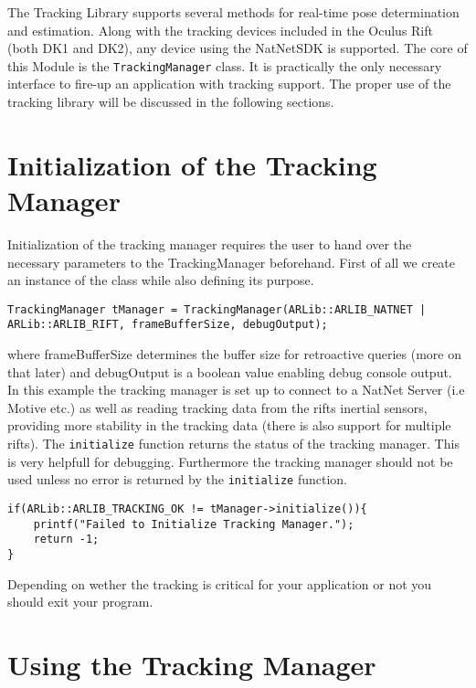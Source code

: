 The Tracking Library supports several methods for real-time pose determination and estimation. Along with the tracking devices included in the Oculus Rift (both DK1 and DK2\cite{dk2}), any device using the NatNetSDK\cite{optitrack} is supported. The core of this Module is the \texttt{TrackingManager} class. It is practically the only necessary interface to fire-up an application with tracking support. The proper use of the tracking library will be discussed in the following sections.
\section{Initialization of the Tracking Manager}\label{tracking-manager-initialization}

Initialization of the tracking manager requires the user to hand over the necessary parameters to the TrackingManager beforehand. First of all we create an instance of the class while also defining its purpose.

\begin{lstlisting}
TrackingManager tManager = TrackingManager(ARLib::ARLIB_NATNET | ARLib::ARLIB_RIFT, frameBufferSize, debugOutput);
\end{lstlisting}
where frameBufferSize determines the buffer size for retroactive queries (more on that later) and debugOutput is a boolean value enabling debug console output. In this example the tracking manager is set up to connect to a NatNet Server (i.e Motive etc.) as well as reading tracking data from the rifts inertial sensors, providing more stability in the tracking data (there is also support for multiple rifts).
The \texttt{initialize} function returns the status of the tracking manager. This is very helpfull for debugging. Furthermore the tracking manager should not be used unless no error is returned by the \texttt{initialize} function.

\begin{lstlisting}
if(ARLib::ARLIB_TRACKING_OK != tManager->initialize()){
    printf("Failed to Initialize Tracking Manager.");
    return -1;
}
\end{lstlisting}
Depending on wether the tracking is critical for your application or not you should exit your program.

\section{Using the Tracking Manager}\label{using-the-tracking-manager}

